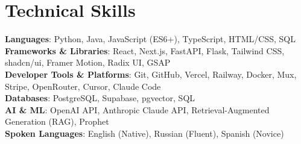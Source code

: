 \documentclass[letterpaper,11pt]{article}
\begin{document}
\section{Technical Skills}
\begin{itemize}[leftmargin=0.15in, label={}]
  \small{\item{
    \textbf{Languages}{: Python, Java, JavaScript (ES6+), TypeScript, HTML/CSS, SQL} \\
    \textbf{Frameworks \& Libraries}{: React, Next.js, FastAPI, Flask, Tailwind CSS, shadcn/ui, Framer Motion, Radix UI, GSAP} \\
    \textbf{Developer Tools \& Platforms}{: Git, GitHub, Vercel, Railway, Docker, Mux, Stripe, OpenRouter, Cursor, Claude Code} \\
    \textbf{Databases}{: PostgreSQL, Supabase, pgvector, SQL} \\
    \textbf{AI \& ML}{: OpenAI API, Anthropic Claude API, Retrieval-Augmented Generation (RAG), Prophet} \\
    \textbf{Spoken Languages}{: English (Native), Russian (Fluent), Spanish (Novice)}
  }}
\end{itemize}

\end{document}
